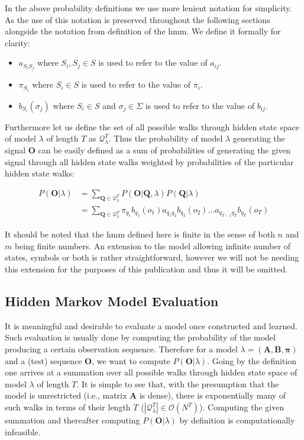 In the above probability definitions we use more lenient notation for simplicity. As the use of this notation is preserved throughout the following sections alongside the notation from definition of the \gls{hmm}. We define it formally for clarity:
\begin{itemize}
	\item[] $a_{S_iS_j}$ where $S_i, S_j\in S$ is used to refer to the value of $a_{ij}$.
	\item[] $\pi_{S_i}$ where $S_i\in S$ is used to refer to the value of $\pi_i$.
	\item[] $b_{S_i}(\sigma_j)$ where $S_i\in S$ and $\sigma_j\in \Sigma$ is used to refer to the value of $b_{ij}$.
\end{itemize}

Furthermore let us define the set of all possible walks through hidden state space of model $\lambda$ of length $T$ as $\mathcal{Q}_\lambda^T$. Thus the probability of model $\lambda$ generating the signal $\mathbf{O}$ can be easily defined as a sum of probabilities of generating the given signal through all hidden state walks weighted by probabilities of the particular hidden state walks: 

\begin{align*}
P(\mathbf{O}|\lambda)&=\sum_{\mathbf{Q}\in\mathcal{Q}^T_\lambda}{P(\mathbf{O}|\mathbf{Q},\lambda)P(\mathbf{Q}|\lambda)}\\
&=\sum_{\mathbf{Q}\in\mathcal{Q}^T_\lambda}{\pi_{q_1}b_{q_1}(o_1)a_{q_1q_2}b_{q_2}(o_2)...a_{q_{T-1}q_T}b_{q_T}(o_T)}
\end{align*}

It should be noted that the \gls{hmm} defined here is finite in the sense of both $n$ and $m$ being finite numbers. An extension to the model allowing infinite number of states, symbols or both is rather straightforward, however we will not be needing this extension for the purposes of this publication and thus it will be omitted.

\subsection{Hidden Markov Model Evaluation}
It is meaningful and desirable to evaluate a model once constructed and learned. Such evaluation is usually done by computing the probability of the model producing a certain observation sequence. Therefore for a model $\lambda = (\mathbf{A}, \mathbf{B}, \boldsymbol{\pi})$ and a (test) sequence $\mathbf{O}$, we want to compute $P(\mathbf{O}|\lambda)$. Going by the definition one arrives at a summation over all possible walks through hidden state space of model $\lambda$ of length $T$. It is simple to see that, with the presumption that the model is unrestricted (i.e., matrix $\mathbf{A}$ is dense), there is exponentially many of such walks in terms of their length $T$ ($|\mathcal{Q}_\lambda^T|\in\mathcal{O}(N^T)$). Computing the given summation and thereafter computing $P(\mathbf{O}|\lambda)$ by definition is computationally infeasible.

